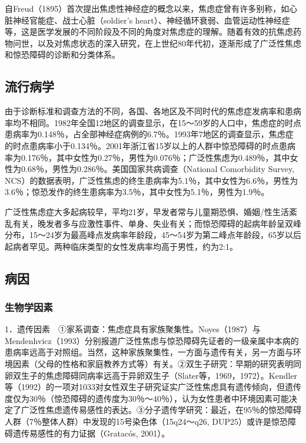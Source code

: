 自Freud（1895）首次提出焦虑性神经症的概念以来，焦虑症曾有许多别称，如心脏神经官能症、战士心脏（soldier's
heart）、神经循环衰弱、血管运动性神经症等，这是医学发展的不同阶段及不同的角度对焦虑症的理解。随着有效的抗焦虑药物问世，以及对焦虑状态的深入研究，在上世纪80年代初，逐渐形成了广泛性焦虑和惊恐障碍的诊断和分类体系。

\subsection{流行病学}

由于诊断标准和调查方法的不同，各国、各地区及不同时代的焦虑症发病率和患病率均不相同。1982年全国12地区的调查显示，在15～59岁的人口中，焦虑症的时点患病率为0.148％，占全部神经症病例的6.7％。1993年7地区的调查显示，焦虑症的时点患病率小于0.134％。2001年浙江省15岁以上的人群中惊恐障碍的时点患病率为0.176％，其中女性为0.27％，男性为0.076％；广泛性焦虑为0.489％，其中女性为0.68％，男性为0.286％。美国国家共病调查（National
Comorbidity Survey,
NCS）的数据表明，广泛性焦虑的终生患病率为5.1％，其中女性为6.6％，男性为3.6％；惊恐发作的终生患病率为3.5％，其中女性为5.1％，男性为1.9％。

广泛性焦虑症大多起病较早，平均21岁，早发者常与儿童期恐惧、婚姻/性生活紊乱有关，晚发者多与应激性事件、单身、失业有关；而惊恐障碍的起病年龄呈双峰分布，15～24岁为最高峰点发病率年龄段，45～54岁为第二峰点年龄段，65岁以后起病者罕见。两种临床类型的女性发病率均高于男性，约为2:1。

\subsection{病因}

\subsubsection{生物学因素}

1．遗传因素　①家系调查：焦虑症具有家族聚集性。Noyes（1987）与Mendenhvicz（1993）分别报道广泛性焦虑与惊恐障碍先证者的一级亲属中本病的患病率远高于对照组。当然，这种家族聚集性，一方面与遗传有关，另一方面与环境因素（父母的性格和家庭教养方式等）有关。②双生子研究：早期的研究表明同卵双生子的焦虑障碍同病率远高于异卵双生子（Slater等，1969，1972）。Kendler等（1992）的一项对1033对女性双生子研究证实广泛性焦虑具有遗传倾向，但遗传度仅为30％（惊恐障碍的遗传度为30％～40％），认为女性患者中环境因素可能决定了广泛性焦虑遗传易感性的表达。③分子遗传学研究：最近，在95％的惊恐障碍人群（7％整体人群）中发现的15号染色体（15q24～q26,
DUP25）或许是惊恐障碍遗传易感性的有力证据（Gratacós, 2001）。

